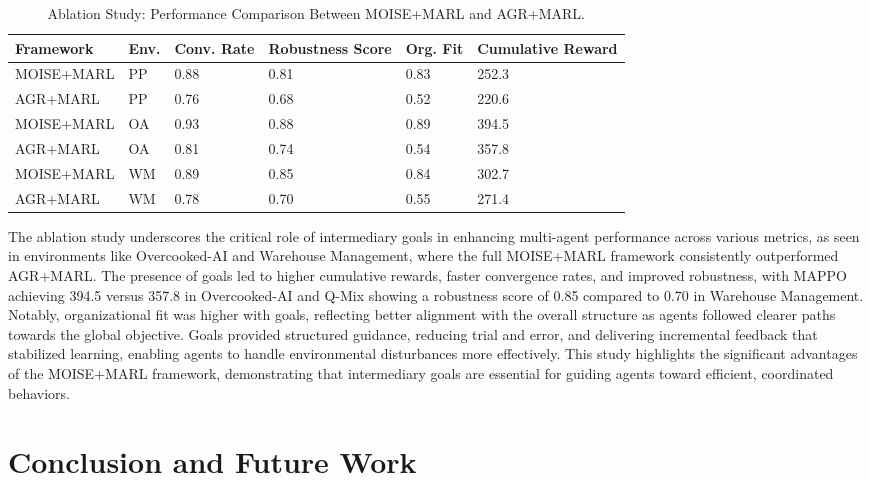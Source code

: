 \documentclass[sigconf,anonymous]{aamas}
\begin{document}
\begin{table}[h!]
    \centering
    \caption{Ablation Study: Performance Comparison Between MOISE+MARL and AGR+MARL.}
    \label{tab:ablation_study}
    \small
    \renewcommand{\arraystretch}{1.1}
    \begin{tabular}{p{1.6cm}p{0.5cm}p{0.6cm}p{1.4cm}p{0.8cm}p{1.3cm}}
        \hline
        \textbf{Framework} & \textbf{Env.} & \textbf{Conv. Rate} & \textbf{Robustness Score} & \textbf{Org. Fit} & \textbf{Cumulative Reward} \\ \hline
        MOISE+MARL & PP & 0.88 & 0.81 & 0.83 & 252.3 \\
        AGR+MARL & PP & 0.76 & 0.68 & 0.52 & 220.6 \\
        MOISE+MARL & OA & 0.93 & 0.88 & 0.89 & 394.5 \\
        AGR+MARL & OA & 0.81 & 0.74 & 0.54 & 357.8 \\
        MOISE+MARL & WM & 0.89 & 0.85 & 0.84 & 302.7 \\
        AGR+MARL & WM & 0.78 & 0.70 & 0.55 & 271.4 \\ \hline
    \end{tabular}
\end{table}

The ablation study underscores the critical role of intermediary goals in enhancing multi-agent performance across various metrics, as seen in environments like Overcooked-AI and Warehouse Management, where the full MOISE+MARL framework consistently outperformed AGR+MARL. The presence of goals led to higher cumulative rewards, faster convergence rates, and improved robustness, with MAPPO achieving 394.5 versus 357.8 in Overcooked-AI and Q-Mix showing a robustness score of 0.85 compared to 0.70 in Warehouse Management. Notably, organizational fit was higher with goals, reflecting better alignment with the overall structure as agents followed clearer paths towards the global objective. Goals provided structured guidance, reducing trial and error, and delivering incremental feedback that stabilized learning, enabling agents to handle environmental disturbances more effectively. This study highlights the significant advantages of the MOISE+MARL framework, demonstrating that intermediary goals are essential for guiding agents toward efficient, coordinated behaviors.


\section{Conclusion and Future Work}
\label{sec:discussion_conclusion_future_work}
\end{document}
